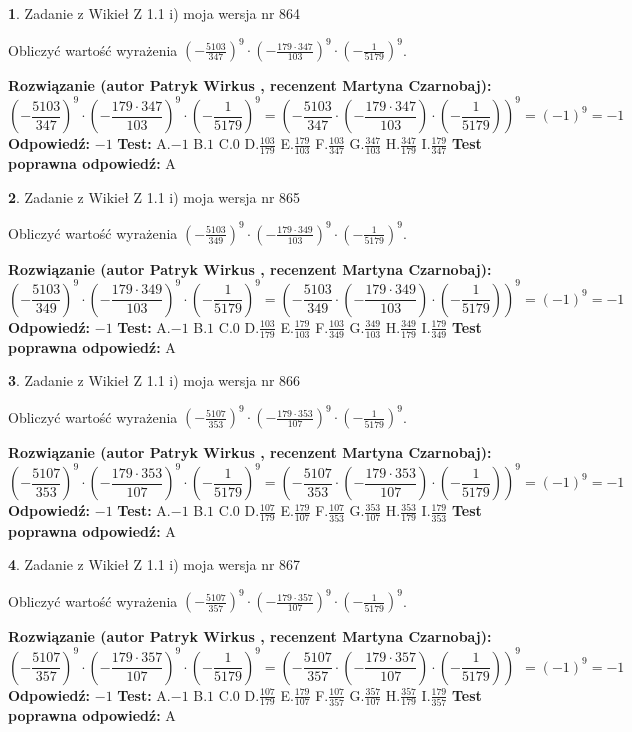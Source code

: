 \documentclass[12pt, a4paper]{article}
\theoremstyle{definition} %
\newtheorem{zad}{}
\newcommand{\zadStart}[1]{\begin{zad}#1\newline}
\newcommand{\zadStop}{\end{zad}}
\newcommand{\rozwStart}[2]{\noindent \textbf{Rozwiązanie (autor #1 , recenzent #2): }\newline}
\newcommand{\rozwStop}{\newline}
\newcommand{\odpStart}{\noindent \textbf{Odpowiedź:}\newline}
\newcommand{\odpStop}{\newline}
\newcommand{\testStart}{\noindent \textbf{Test:}\newline}
\newcommand{\testStop}{\newline}
\newcommand{\kluczStart}{\noindent \textbf{Test poprawna odpowiedź:}\newline}
\newcommand{\kluczStop}{\newline}
\begin{document}
\zadStart{Zadanie z Wikieł Z 1.1 i) moja wersja nr 864}

Obliczyć wartość wyrażenia $(-\frac{5103}{347})^{9} \cdot (-\frac{179 \cdot 347}{103})^{9} \cdot (-\frac{1}{5179})^{9}$.
\zadStop
\rozwStart{Patryk Wirkus}{Martyna Czarnobaj}
$$(-\frac{5103}{347})^{9} \cdot (-\frac{179 \cdot 347}{103})^{9} \cdot (-\frac{1}{5179})^{9} = (-\frac{5103}{347} \cdot (-\frac{179 \cdot 347}{103}) \cdot (-\frac{1}{5179}))^{9} = (-1)^{9} = -1$$
\rozwStop
\odpStart
$-1$
\odpStop
\testStart
A.$-1$ B.$1$ C.$0$ D.$\frac{103}{179}$ E.$\frac{179}{103}$
F.$\frac{103}{347}$ G.$\frac{347}{103}$
H.$\frac{347}{179}$
I.$\frac{179}{347}$
\testStop
\kluczStart
A
\kluczStop



\zadStart{Zadanie z Wikieł Z 1.1 i) moja wersja nr 865}

Obliczyć wartość wyrażenia $(-\frac{5103}{349})^{9} \cdot (-\frac{179 \cdot 349}{103})^{9} \cdot (-\frac{1}{5179})^{9}$.
\zadStop
\rozwStart{Patryk Wirkus}{Martyna Czarnobaj}
$$(-\frac{5103}{349})^{9} \cdot (-\frac{179 \cdot 349}{103})^{9} \cdot (-\frac{1}{5179})^{9} = (-\frac{5103}{349} \cdot (-\frac{179 \cdot 349}{103}) \cdot (-\frac{1}{5179}))^{9} = (-1)^{9} = -1$$
\rozwStop
\odpStart
$-1$
\odpStop
\testStart
A.$-1$ B.$1$ C.$0$ D.$\frac{103}{179}$ E.$\frac{179}{103}$
F.$\frac{103}{349}$ G.$\frac{349}{103}$
H.$\frac{349}{179}$
I.$\frac{179}{349}$
\testStop
\kluczStart
A
\kluczStop



\zadStart{Zadanie z Wikieł Z 1.1 i) moja wersja nr 866}

Obliczyć wartość wyrażenia $(-\frac{5107}{353})^{9} \cdot (-\frac{179 \cdot 353}{107})^{9} \cdot (-\frac{1}{5179})^{9}$.
\zadStop
\rozwStart{Patryk Wirkus}{Martyna Czarnobaj}
$$(-\frac{5107}{353})^{9} \cdot (-\frac{179 \cdot 353}{107})^{9} \cdot (-\frac{1}{5179})^{9} = (-\frac{5107}{353} \cdot (-\frac{179 \cdot 353}{107}) \cdot (-\frac{1}{5179}))^{9} = (-1)^{9} = -1$$
\rozwStop
\odpStart
$-1$
\odpStop
\testStart
A.$-1$ B.$1$ C.$0$ D.$\frac{107}{179}$ E.$\frac{179}{107}$
F.$\frac{107}{353}$ G.$\frac{353}{107}$
H.$\frac{353}{179}$
I.$\frac{179}{353}$
\testStop
\kluczStart
A
\kluczStop



\zadStart{Zadanie z Wikieł Z 1.1 i) moja wersja nr 867}

Obliczyć wartość wyrażenia $(-\frac{5107}{357})^{9} \cdot (-\frac{179 \cdot 357}{107})^{9} \cdot (-\frac{1}{5179})^{9}$.
\zadStop
\rozwStart{Patryk Wirkus}{Martyna Czarnobaj}
$$(-\frac{5107}{357})^{9} \cdot (-\frac{179 \cdot 357}{107})^{9} \cdot (-\frac{1}{5179})^{9} = (-\frac{5107}{357} \cdot (-\frac{179 \cdot 357}{107}) \cdot (-\frac{1}{5179}))^{9} = (-1)^{9} = -1$$
\rozwStop
\odpStart
$-1$
\odpStop
\testStart
A.$-1$ B.$1$ C.$0$ D.$\frac{107}{179}$ E.$\frac{179}{107}$
F.$\frac{107}{357}$ G.$\frac{357}{107}$
H.$\frac{357}{179}$
I.$\frac{179}{357}$
\testStop
\kluczStart
A
\kluczStop
\end{document}
